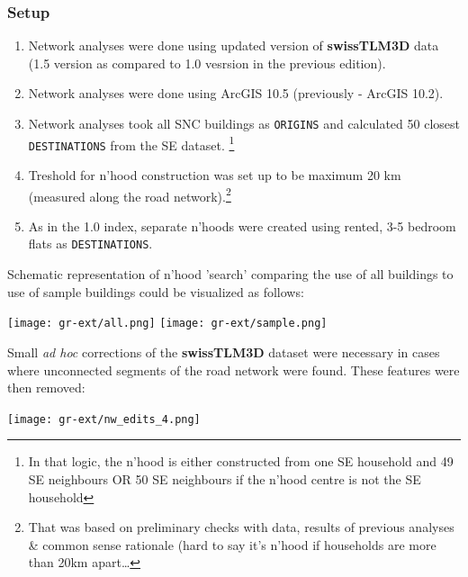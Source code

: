 \documentclass[a4paper, notitlepage, fleqn]{article} %
\begin{document}
\subsubsection{Setup}

\begin{enumerate}

	\item Network analyses were done using updated version of \textbf{swissTLM3D} data 
		(1.5 version as compared to 1.0 vesrsion in the previous edition).
	
	\item Network analyses were done using ArcGIS 10.5 (previously - ArcGIS 10.2).
	
	\item Network analyses took all SNC buildings as \texttt{ORIGINS} and calculated 
		50 closest \texttt{DESTINATIONS} from the SE dataset.
		\footnote{In that logic, the n'hood is either constructed from one SE household and 49 SE neighbours 
		OR 50 SE neighbours if the n'hood centre is not the SE household}		
	
	\item Treshold for n'hood construction was set up to be maximum 20 km (measured along the road network).\footnote{That was based 
		on preliminary checks with data, results of previous analyses \& common sense rationale (hard to say it's n'hood if households are more than 20km apart\ldots}
	
	\item As in the 1.0 index, separate n'hoods were created using rented, 3-5 bedroom flats as \texttt{DESTINATIONS}. 

\end{enumerate}

Schematic representation of n'hood 'search' comparing the use of all buildings to use of sample buildings could be visualized as follows: 

\begin{center}
\texttt{[image: gr-ext/all.png]}
\texttt{[image: gr-ext/sample.png]} 
\end{center}

Small \textit{ad hoc} corrections of the \textbf{swissTLM3D} dataset were necessary in cases where unconnected segments of the road network were found. These features were then removed: 

\begin{center}
\texttt{[image: gr-ext/nw\_edits\_4.png]}
\end{center}
\end{document}
